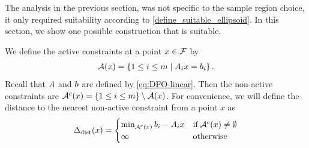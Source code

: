 \documentclass{article}
\begin{document}
The analysis in the previous section, was not specific to the sample region choice, it only required suitability according to \cref{define_suitable_ellipsoid}.
In this section, we show one possible construction that is suitable.

We define the active constraints at a point $x \in {\mathcal F}$ by
\begin{align}
{\mathcal A}(x) = \left\{1 \le i \le m \; | \; {{A}}_ix = {{b}}_i \right\}. \label{define_activei}
\end{align}
Recall that ${A}$ and ${b}$ are defined by \cref{eq:DFO-linear}.
Then the non-active constraints are ${\mathcal A}^c(x) = \left\{1 \le i \le m\right\} \setminus {\mathcal A}(x)$.
For convenience, we will define the distance to the nearest non-active constraint from a point $x$ as
\begin{align}
\label{nearestnonactive}
\Delta_{\textrm{dist}}(x) =
\begin{cases}
\min_{{\mathcal A}^c(x)}{b_i - A_i x} & \text{if} \; {\mathcal A}^c(x) \ne \emptyset \\
\infty & \textrm{otherwise}
\end{cases}
\end{align}
\end{document}
